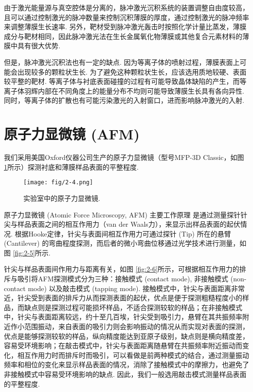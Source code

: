 \documentclass[12pt,a4paper,openany,twoside,UTF-8]{book}
\begin{document}
由于激光能量源与真空腔体是分离的，脉冲激光沉积系统的装置调整自由度较高，且可以通过控制激光的脉冲数量来控制沉积薄膜的厚度，通过控制激光的脉冲频率来调整薄膜生长速率. 另外，靶材受到脉冲激光轰击时按照化学计量比蒸发，薄膜成分与靶材相同，因此脉冲激光法在生长金属氧化物薄膜或其他复合元素材料的薄膜中具有很大优势.

但是，脉冲激光沉积法也有一定的缺点. 因为等离子体的喷射过程，薄膜表面上可能会出现较多的颗粒状生长. 为了避免这种颗粒状生长，应该选用质地较硬、表面较平整的靶材. 等离子体与衬底表面碰撞的过程有可能导致晶体缺陷的产生，而等离子体羽辉内部在不同角度上的能量分布不均则可能导致薄膜生长具有各向异性. 同时，等离子体的扩散也有可能污染激光的入射窗口，进而影响脉冲激光的入射.

\section{原子力显微镜 (AFM)}
我们采用美国Oxford仪器公司生产的原子力显微镜（型号MFP-3D Classic，如图 \ref{fig:2-4}所示）探测衬底和薄膜样品表面的平整程度.

\begin{figure}[htbp]
\centering
\texttt{[image: fig/2-4.png]}
\caption{实验室中的原子力显微镜.}
\label{fig:2-4} 
\end{figure}

原子力显微镜 (Atomic Force Microscopy, AFM) 主要工作原理 \cite{ref24}是通过测量探针针尖与样品表面之间的相互作用力（van der Waals力），来显示出样品表面的起伏情况. 根据Hooke定律，针尖与表面间相互作用力可通过探针 (Tip) 所在的悬臂 (Cantilever) 的弯曲程度探测，而后者的微小弯曲位移通过光学技术进行测量，如图 \ref{fig:2-5}所示. 

针尖与样品表面间作用力与距离有关，如图 \ref{fig:2-6}所示，可根据相互作用力的排斥与吸引将AFM探测模式分为三种：接触模式 (contact mode), 非接触模式 (non-contact mode) 以及敲击模式 (tapping mode). 接触模式中，针尖与表面距离非常近，针尖受到表面的排斥力从而探测表面的起伏，优点是便于探测粗糙程度小的样品，而缺点则是探测过程可能损坏样品，不适合探测较软的样品；在非接触模式中，针尖与表面距离较远，约十至几百埃，针尖受到吸引力，悬臂在其共振频率附近作小范围振动，来自表面的吸引力则会影响振动的情况从而实现对表面的探测，优点是能够探测较软的样品，纵向精度能达到亚原子级别，缺点则是横向精度差，容易受环境影响；在敲击模式中，针尖与表面距离随悬臂在共振频率附近振动而变化，相互作用力时而排斥时而吸引，可以看做是前两种模式的结合，通过测量振动频率和相位的变化来显示样品表面的情况，消除了接触模式中的摩擦力，也避免了非接触模式中容易受环境影响的缺点. 因此，我们一般选用敲击模式测量样品表面的平整程度.
\end{document}
